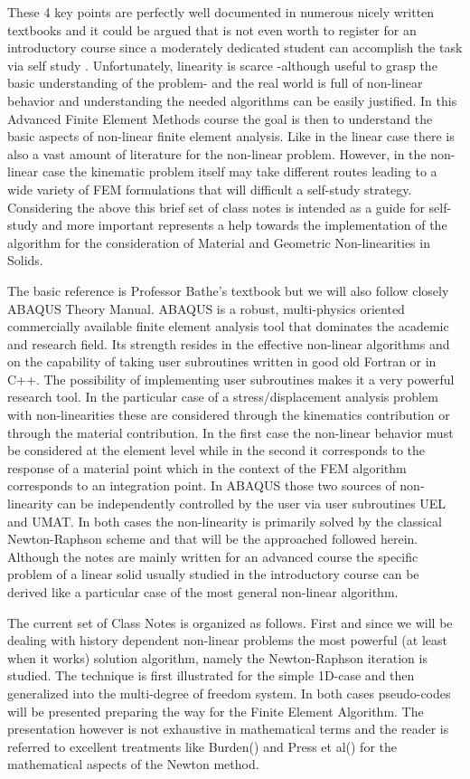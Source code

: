 These 4 key points are perfectly well documented in numerous nicely written textbooks and it could be argued that is not even worth to register for an introductory course since a moderately dedicated student can accomplish the task via self study . Unfortunately, linearity is scarce -although useful to grasp the basic understanding of the problem- and the real world is full of non-linear behavior and understanding the needed algorithms can be easily justified.  In this Advanced Finite Element Methods course the goal is then to understand the basic aspects of non-linear finite element analysis.  Like in the linear case there is also a vast amount of literature for the non-linear problem.  However, in the non-linear case the kinematic problem itself may take different routes leading to a wide variety of FEM formulations that will difficult a self-study strategy.  Considering the above this brief set of class notes is intended as a guide for self-study and more important represents a help towards the implementation of the algorithm for the consideration of Material and Geometric Non-linearities in Solids.

The basic reference is Professor Bathe's textbook but we will also follow closely ABAQUS Theory Manual.  ABAQUS is a robust, multi-physics oriented commercially available finite element analysis tool that dominates the academic and research field.  Its strength resides in the effective non-linear algorithms and on the capability of taking user subroutines written in good old Fortran or in C++.  The possibility of implementing user subroutines makes it a very powerful research tool.  In the particular case of a stress/displacement analysis problem with non-linearities these are considered through the kinematics contribution or through the material contribution.  In the first case the non-linear behavior must be considered at the element level while in the second it corresponds to the response of a material point which in the context of the FEM algorithm corresponds to an integration point.  In ABAQUS those two sources of non-linearity can be independently controlled by the user via user subroutines UEL and UMAT.  In both cases the non-linearity is primarily solved by the classical Newton-Raphson scheme and that will be the approached followed herein.  Although the notes are mainly written for an advanced course the specific problem of a linear solid usually studied in the introductory course can be derived like a particular case of the most general non-linear algorithm.

The current set of Class Notes is organized as follows.  First and since we will be dealing with history dependent non-linear problems the most powerful (at least when it works) solution algorithm, namely the Newton-Raphson iteration is studied.  The technique is first illustrated for the simple 1D-case and then generalized into the multi-degree of freedom system.  In both cases pseudo-codes will be presented preparing the way for the Finite Element Algorithm.  The presentation however is not exhaustive in mathematical terms and the reader is referred to excellent treatments like Burden() and Press et al() for the mathematical aspects of the Newton method.

